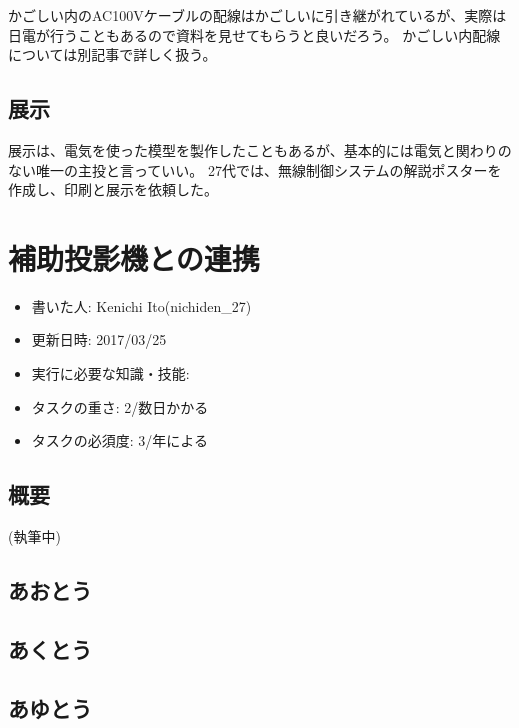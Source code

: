 \documentclass[letterpaper,10pt,dvipdfmx]{sphinxmanual}
\begin{document}
かごしい内のAC100Vケーブルの配線はかごしいに引き継がれているが、実際は日電が行うこともあるので資料を見せてもらうと良いだろう。
かごしい内配線については別記事で詳しく扱う。


\section{展示}
\label{\detokenize{syutou:id10}}
展示は、電気を使った模型を製作したこともあるが、基本的には電気と関わりのない唯一の主投と言っていい。
27代では、無線制御システムの解説ポスターを作成し、印刷と展示を依頼した。


\chapter{補助投影機との連携}
\label{\detokenize{hojotou::doc}}\label{\detokenize{hojotou:id1}}\begin{itemize}
\item {} 
書いた人: Kenichi Ito(nichiden\_27)

\item {} 
更新日時: 2017/03/25

\item {} 
実行に必要な知識・技能:

\item {} 
タスクの重さ: 2/数日かかる

\item {} 
タスクの必須度: 3/年による

\end{itemize}


\section{概要}
\label{\detokenize{hojotou:id2}}
(執筆中)


\section{あおとう}
\label{\detokenize{hojotou:id3}}

\section{あくとう}
\label{\detokenize{hojotou:id4}}

\section{あゆとう}
\label{\detokenize{hojotou:id5}}
\end{document}
